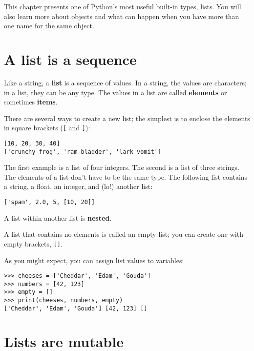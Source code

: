 \documentclass[10pt]{book}
\begin{document}
This chapter presents one of Python's most useful built-in types, lists.
You will also learn more about objects and what can happen when you have
more than one name for the same object.


\section{A list is a sequence}
\label{sequence}

Like a string, a {\bf list} is a sequence of values.  In a string, the
values are characters; in a list, they can be any type.  The values in
a list are called {\bf elements} or sometimes {\bf items}.

There are several ways to create a new list; the simplest is to
enclose the elements in square brackets (\verb"[" and \verb"]"):

\begin{verbatim}
[10, 20, 30, 40]
['crunchy frog', 'ram bladder', 'lark vomit']
\end{verbatim}
%
The first example is a list of four integers.  The second is a list of
three strings.  The elements of a list don't have to be the same type.
The following list contains a string, a float, an integer, and
(lo!) another list:

\begin{verbatim}
['spam', 2.0, 5, [10, 20]]
\end{verbatim}
%
A list within another list is {\bf nested}.

A list that contains no elements is
called an empty list; you can create one with empty
brackets, \verb"[]".

As you might expect, you can assign list values to variables:

\begin{verbatim}
>>> cheeses = ['Cheddar', 'Edam', 'Gouda']
>>> numbers = [42, 123]
>>> empty = []
>>> print(cheeses, numbers, empty)
['Cheddar', 'Edam', 'Gouda'] [42, 123] []
\end{verbatim}
%


\section{Lists are mutable}
\label{mutable}
\end{document}
